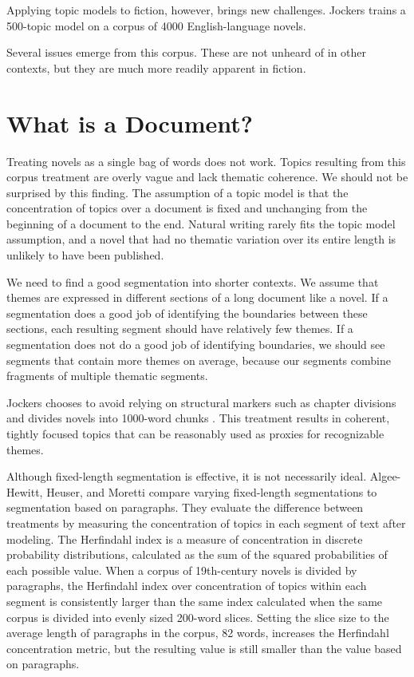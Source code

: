 Applying topic models to fiction, however, brings new challenges. Jockers \citep{jockers-13} trains a 500-topic model on a corpus of 4000 English-language novels.

Several issues emerge from this corpus. These are not unheard of in other contexts, but they are much more readily apparent in fiction.

\section{What is a Document?}

Treating novels as a single bag of words does not work.
Topics resulting from this corpus treatment are overly vague and lack thematic coherence.
We should not be surprised by this finding.
The assumption of a topic model is that the concentration of topics over a document is fixed and unchanging from the beginning of a document to the end.
Natural writing rarely fits the topic model assumption, and a novel that had no thematic variation over its entire length is unlikely to have been published.

We need to find a good segmentation into shorter contexts.
We assume that themes are expressed in different sections of a long document like a novel.
If a segmentation does a good job of identifying the boundaries between these sections, each resulting segment should have relatively few themes.
If a segmentation does not do a good job of identifying boundaries, we should see segments that contain more themes on average, because our segments combine fragments of multiple thematic segments.

Jockers chooses to avoid relying on structural markers such as chapter divisions and divides novels into 1000-word chunks \citep{jockers-13}. 
This treatment results in coherent, tightly focused topics that can be reasonably used as proxies for recognizable themes.

Although fixed-length segmentation is effective, it is not necessarily ideal.
Algee-Hewitt, Heuser, and Moretti \citep{algeehewitt2015paragraphs} compare varying fixed-length segmentations to segmentation based on paragraphs.
They evaluate the difference between treatments by measuring the concentration of topics in each segment of text after modeling.
The Herfindahl index is a measure of concentration in discrete probability distributions, calculated as the sum of the squared probabilities of each possible value.
When a corpus of 19th-century novels is divided by paragraphs, the Herfindahl index over concentration of topics within each segment is consistently larger than the same index calculated when the same corpus is divided into evenly sized 200-word slices.
Setting the slice size to the average length of paragraphs in the corpus, 82 words, increases the Herfindahl concentration metric, but the resulting value is still smaller than the value based on paragraphs.

